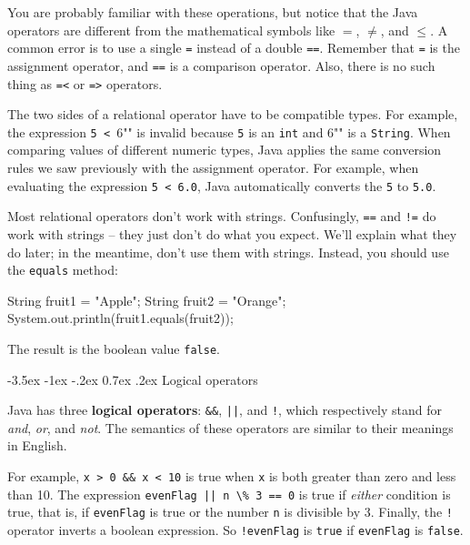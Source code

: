 \documentclass[12pt]{book}
\makeatletter
\theoremstyle{exercise}
\newcommand{\java}[1]{\verb"#1"}
\renewcommand{\section}{\@startsection{section}{1}{\z@}%
    {-3.5ex \@plus -1ex \@minus -.2ex}%
    {0.7ex \@plus.2ex}%
    {\normalfont\Large\bfseries}}
\newcommand{\java}[1]{\lstinline{#1}} %
\makeatother
\begin{document}
You are probably familiar with these operations, but notice that the Java operators are different from the mathematical symbols like $=$, $\neq$, and $\le$.
A common error is to use a single \java{=} instead of a double \java{==}.
Remember that \java{=} is the assignment operator, and \java{==} is a comparison operator.
Also, there is no such thing as \java{=<} or \java{=>} operators.

The two sides of a relational operator have to be compatible types.
For example, the expression \java{5 < "6"} is invalid because \java{5} is an \java{int} and \java{"6"} is a \java{String}.
When comparing values of different numeric types, Java applies the same conversion rules we saw previously with the assignment operator.
For example, when evaluating the expression \java{5 < 6.0}, Java automatically converts the \java{5} to \java{5.0}.

Most relational operators don't work with strings.
Confusingly, \java{==} and \java{!=} do work with strings -- they just don't do what you expect.
We'll explain what they do later; in the meantime, don't use them with strings.
Instead, you should use the \java{equals} method:

\begin{code}
    String fruit1 = "Apple";
    String fruit2 = "Orange";
    System.out.println(fruit1.equals(fruit2));
\end{code}

The result is the boolean value \java{false}.


\section{Logical operators}


Java has three {\bf logical operators}: \java{&&}, \java{||}, and \java{!}, which respectively stand for {\it and}, {\it or}, and {\it not}.
The semantics of these operators are similar to their meanings in English.

For example, \java{x > 0 && x < 10} is true when \java{x} is both greater than zero and less than 10.
The expression \java{evenFlag || n \% 3 == 0} is true if {\it either} condition is true, that is, if \java{evenFlag} is true or the number \java{n} is divisible by 3.
Finally, the \java{!} operator inverts a boolean expression.
So \java{!evenFlag} is \java{true} if \java{evenFlag} is \java{false}.

\end{document}
